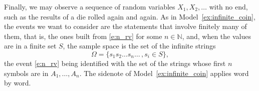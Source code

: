 \begin{model}
	\label{ex:inf_rv}
	Finally, we may observe a sequence of random variables $X_1, X_2, \ldots$ with no end, such as the results of a die rolled again and again. As in Model~\ref{ex:infinite_coin}, the events we want to consider are the statements that involve finitely many of them, that is, the ones built from \eqref{e:n_rv} for some $n \in \mathbb N$, and, when the values are in a finite set $S$, the sample space is the set of the infinite strings 
	\begin{equation}
		\label{e:inf_rv_strings}
		\Omega = \{ s_1 s_2 \ldots s_n \ldots \,, s_i \in S \}, 
	\end{equation}
	the event \eqref{e:n_rv} being identified with the set of the strings whose first $n$ symbols are in $A_1, \ldots, A_n$. The sidenote of Model~\ref{ex:infinite_coin} applies word by word. 
\end{model}

